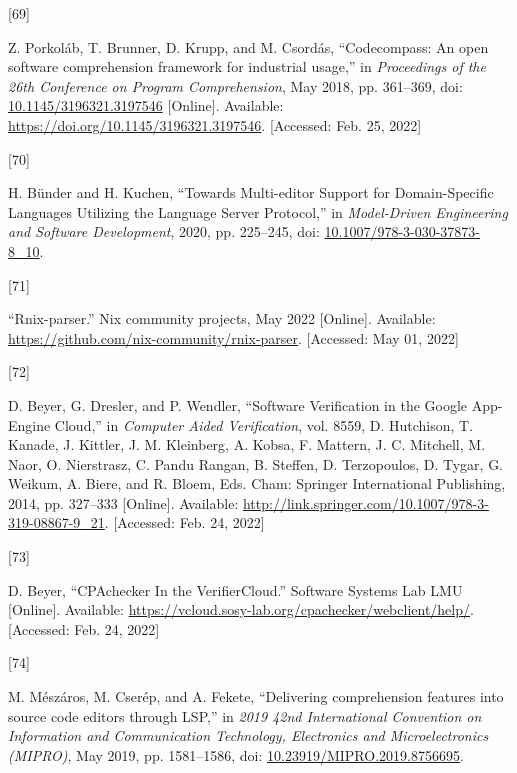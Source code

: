 \documentclass[
  a4paper,
  bibtex,
  english,
  nomenclature]{kthlatex/kththesis/kththesis}
\newlength{\cslhangindent}
\newlength{\csllabelwidth}
\newlength{\cslentryspacingunit} %
\newenvironment{CSLReferences}[2] %
 {%
  \setlength{\parindent}{0pt}
  \ifodd #1
  \let\oldpar\par
  \def\par{\hangindent=\cslhangindent\oldpar}
  \fi
  \setlength{\parskip}{#2\cslentryspacingunit}
 }%
 {}
\newcommand{\CSLLeftMargin}[1]{\parbox[t]{\csllabelwidth}{#1}}
\newcommand{\CSLRightInline}[1]{\parbox[t]{\linewidth - \csllabelwidth}{#1}\break}
\begin{document}
\begin{CSLReferences}{0}{0}
\leavevmode{}%
\CSLLeftMargin{{[}69{]} }
\CSLRightInline{Z. Porkoláb, T. Brunner, D. Krupp, and M. Csordás,
{``Codecompass: An open software comprehension framework for industrial
usage,''} in \emph{Proceedings of the 26th {Conference} on {Program
Comprehension}}, May 2018, pp. 361--369, doi:
\href{https://doi.org/10.1145/3196321.3197546}{10.1145/3196321.3197546}
{[}Online{]}. Available: \url{https://doi.org/10.1145/3196321.3197546}.
{[}Accessed: Feb. 25, 2022{]}}

\leavevmode{}%
\CSLLeftMargin{{[}70{]} }
\CSLRightInline{H. Bünder and H. Kuchen, {``Towards {Multi-editor
Support} for {Domain-Specific Languages Utilizing} the {Language Server
Protocol},''} in \emph{Model-{Driven Engineering} and {Software
Development}}, 2020, pp. 225--245, doi:
\href{https://doi.org/10.1007/978-3-030-37873-8_10}{10.1007/978-3-030-37873-8\_10}.
}

\leavevmode{}%
\CSLLeftMargin{{[}71{]} }
\CSLRightInline{{``Rnix-parser.''} Nix community projects, May 2022
{[}Online{]}. Available:
\url{https://github.com/nix-community/rnix-parser}. {[}Accessed: May 01,
2022{]}}

\leavevmode{}%
\CSLLeftMargin{{[}72{]} }
\CSLRightInline{D. Beyer, G. Dresler, and P. Wendler, {``Software
{Verification} in the {Google App-Engine Cloud},''} in \emph{Computer
{Aided Verification}}, vol. 8559, D. Hutchison, T. Kanade, J. Kittler,
J. M. Kleinberg, A. Kobsa, F. Mattern, J. C. Mitchell, M. Naor, O.
Nierstrasz, C. Pandu Rangan, B. Steffen, D. Terzopoulos, D. Tygar, G.
Weikum, A. Biere, and R. Bloem, Eds. {Cham}: {Springer International
Publishing}, 2014, pp. 327--333 {[}Online{]}. Available:
\url{http://link.springer.com/10.1007/978-3-319-08867-9_21}.
{[}Accessed: Feb. 24, 2022{]}}

\leavevmode{}%
\CSLLeftMargin{{[}73{]} }
\CSLRightInline{D. Beyer, {``{CPAchecker In} the {VerifierCloud}.''}
Software Systems Lab LMU {[}Online{]}. Available:
\url{https://vcloud.sosy-lab.org/cpachecker/webclient/help/}.
{[}Accessed: Feb. 24, 2022{]}}

\leavevmode{}%
\CSLLeftMargin{{[}74{]} }
\CSLRightInline{M. Mészáros, M. Cserép, and A. Fekete, {``Delivering
comprehension features into source code editors through {LSP},''} in
\emph{2019 42nd {International Convention} on {Information} and
{Communication Technology}, {Electronics} and {Microelectronics}
({MIPRO})}, May 2019, pp. 1581--1586, doi:
\href{https://doi.org/10.23919/MIPRO.2019.8756695}{10.23919/MIPRO.2019.8756695}.
}


\end{CSLReferences}
\end{document}
